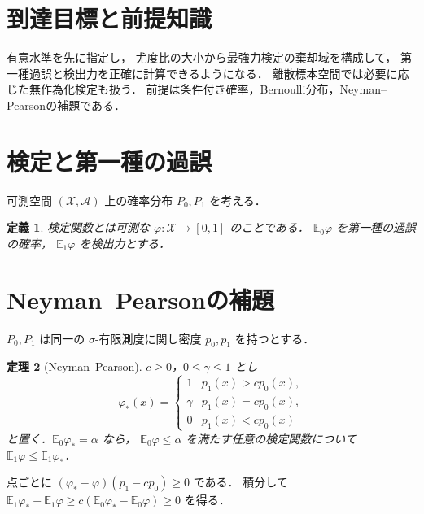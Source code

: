 \documentclass[a5paper,10pt,onecolumn]{jsarticle}
\makeatletter
\theoremstyle{mathnotetheorem}
\newtheorem{theorem}{定理}[section]
\newtheorem{definition}[theorem]{定義}
\renewcommand{\proofname}{証明}
\renewenvironment{proof}[1][\proofname]{%
  \par\pushQED{\qed}\normalfont\topsep4\p@\@plus2\p@\relax
  \trivlist\item[\hskip\labelsep\bfseries #1]\ignorespaces
}{\popQED\endtrivlist\@endpefalse}
\makeatother
\begin{document}
\section*{到達目標と前提知識}
有意水準を先に指定し，
尤度比の大小から最強力検定の棄却域を構成して，
第一種過誤と検出力を正確に計算できるようになる．
離散標本空間では必要に応じた無作為化検定も扱う．
前提は条件付き確率，Bernoulli分布，Neyman--Pearsonの補題である．

\section{検定と第一種の過誤}
可測空間 $(\mathcal X,\mathcal A)$ 上の確率分布 $P_0,P_1$ を考える．
\begin{definition}
検定関数とは可測な $\varphi:\mathcal X\to[0,1]$ のことである．
$\mathbb E_0\varphi$ を第一種の過誤の確率，
$\mathbb E_1\varphi$ を検出力とする．
\end{definition}
\section{Neyman--Pearsonの補題}
$P_0,P_1$ は同一の $\sigma$-有限測度に関し密度 $p_0,p_1$ を持つとする．
\begin{theorem}[Neyman--Pearson]
$c\ge0$，$0\le\gamma\le1$ とし
\[
 \varphi_*(x)=\begin{cases}1&p_1(x)>cp_0(x),\\
 \gamma&p_1(x)=cp_0(x),\\0&p_1(x)<cp_0(x)
 \end{cases}
\]
と置く．$\mathbb E_0\varphi_*=\alpha$ なら，
$\mathbb E_0\varphi\le\alpha$ を満たす任意の検定関数について
$\mathbb E_1\varphi\le\mathbb E_1\varphi_*$．
\end{theorem}
\begin{proof}
点ごとに
$(\varphi_*-\varphi)(p_1-cp_0)\ge0$ である．
積分して
$\mathbb E_1\varphi_*-\mathbb E_1\varphi
\ge c(\mathbb E_0\varphi_*-\mathbb E_0\varphi)\ge0$ を得る．
\end{proof}
\end{document}
